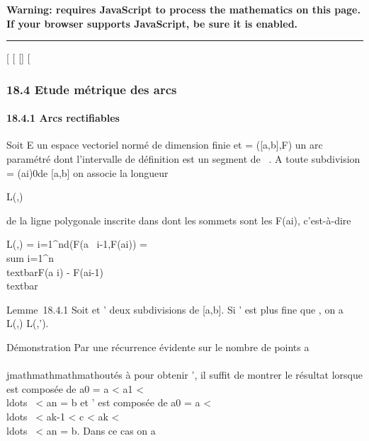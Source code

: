\textbf{Warning: 
requires JavaScript to process the mathematics on this page.\\ If your
browser supports JavaScript, be sure it is enabled.}

\begin{center}\rule{3in}{0.4pt}\end{center}

{[}
{[}
{[}{]}
{[}

\subsubsection{18.4 Etude métrique des arcs}

\paragraph{18.4.1 Arcs rectifiables}

Soit E un espace vectoriel normé de dimension finie et \Gamma = ({[}a,b{]},F)
un arc paramétré dont l'intervalle de définition est un segment de ~. A
toute subdivision \sigma = (ai)0\leqi\leqn de {[}a,b{]} on
associe la longueur

L(\Gamma,\sigma)

de la ligne polygonale inscrite dans \Gamma dont les sommets sont les
F(ai), c'est-à-dire

L(\Gamma,\sigma) = \sum i=1^nd(F(a~
i-1,F(ai)) = \\sum
i=1^n\\textbar{}F(a i) -
F(ai-1)\\textbar{}

Lemme~18.4.1 Soit \sigma et \sigma' deux subdivisions de {[}a,b{]}. Si \sigma' est plus
fine que \sigma, on a L(\Gamma,\sigma) \leq L(\Gamma,\sigma').

Démonstration Par une récurrence évidente sur le nombre de points
a\\\\jmathmathmathmathoutés à \sigma pour obtenir \sigma', il suffit de montrer le résultat lorsque \sigma
est composée de a0 = a \textless{} a1 \textless{}
\\ldots~ \textless{}
an = b et \sigma' est composée de a0 = a \textless{}
\\ldots~ \textless{}
ak-1 \textless{} c \textless{} ak \textless{}
\\ldots~ \textless{}
an = b. Dans ce cas on a

